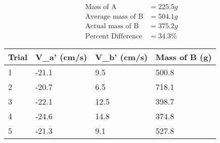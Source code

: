 \begin{equation*}
    \begin{aligned}
        \text{Mass of A}&=225.5g \\
        \text{Average mass of B}&=504.1g \\
        \text{Actual mass of B}&=375.2g \\
        \text{Percent Difference}&=34.3\%
    \end{aligned}    
\end{equation*}
\begin{table}[H]
    \begin{tabular}{|l|l|l|l|}
    \hline
    Trial & V\_a' (cm/s) & V\_b' (cm/s) & Mass of B (g) \\ \hline
    1     & -21.1        & 9.5          & 500.8         \\ \hline
    2     & -20.7        & 6.5          & 718.1         \\ \hline
    3     & -22.1        & 12.5         & 398.7         \\ \hline
    4     & -24.6        & 14.8         & 374.8         \\ \hline
    5     & -21.3        & 9.1          & 527.8         \\ \hline
    \end{tabular}
    \end{table}
    